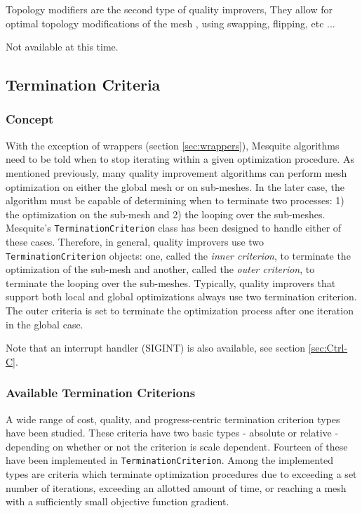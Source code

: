 Topology modifiers are the second type of quality improvers, They allow for optimal topology
modifications of the mesh , using swapping, flipping, etc ... 

Not available at this time. 

\subsection{Termination Criteria}

\subsubsection{Concept}
With the exception of wrappers (section \ref{sec:wrappers}), Mesquite algorithms need to be told
when to stop iterating within a given optimization procedure. 
As mentioned previously, many quality improvement algorithms can
perform mesh optimization on either the global mesh or on sub-meshes.
In the later case, the algorithm must be capable of determining when
to terminate two processes: 1) the optimization on the sub-mesh and 2)
the looping over the sub-meshes.  Mesquite's
\texttt{TerminationCriterion} class has been designed to handle either
of these cases.  Therefore, in general, quality improvers use two
\texttt{TerminationCriterion} objects: one, called the {\it inner
criterion}, to terminate the optimization of the sub-mesh and
another, called the {\it outer criterion}, to terminate the looping
over the sub-meshes.  Typically, quality improvers that support both
local and global optimizations always use two termination criterion. 
The outer criteria is set to terminate the optimization process after
one iteration in the global case.

Note that an interrupt handler (SIGINT) is also available, see section \ref{sec:Ctrl-C}. 

\subsubsection{Available Termination Criterions}
A wide range of cost, quality, 
and progress-centric termination
criterion types have been studied. These criteria have two basic types - 
absolute or relative - depending on whether or not the criterion is scale 
dependent.  Fourteen of these have been
implemented in \texttt{TerminationCriterion}.  Among the implemented
types are criteria which terminate optimization procedures due to
exceeding a set number of iterations, exceeding an allotted amount of
time, or reaching a mesh with a sufficiently small objective function
gradient.  

